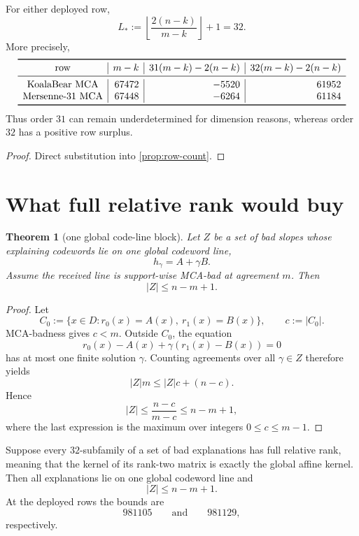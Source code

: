 \documentclass[11pt,a4paper]{amsart}
\numberwithin{equation}{section}
\newtheorem{theorem}{Theorem}[section]
\theoremstyle{remark}
\begin{document}
\begin{proposition}\label{prop:critical-32}
For either deployed row,
\[
 L_*:=\left\lfloor\frac{2(n-k)}{m-k}\right\rfloor+1=32.
\]
More precisely,
\[
\begin{array}{c|r|r|r}
\toprule
\text{row}&m-k&31(m-k)-2(n-k)&32(m-k)-2(n-k)\\
\midrule
\text{KoalaBear MCA}&67472&-5520&61952\\
\text{Mersenne-31 MCA}&67448&-6264&61184\\
\bottomrule
\end{array}
\]
Thus order $31$ can remain underdetermined for dimension reasons, whereas order $32$ has a positive row surplus.
\end{proposition}

\begin{proof}
Direct substitution into \cref{prop:row-count}.
\end{proof}

\section{What full relative rank would buy}

\begin{theorem}[one global code-line block]\label{thm:global-block}
Let $Z$ be a set of bad slopes whose explaining codewords lie on one global codeword line,
\[
 h_\gamma=A+\gamma B.
\]
Assume the received line is support-wise MCA-bad at agreement $m$.  Then
\[
 \boxed{|Z|\le n-m+1.}
\]
\end{theorem}

\begin{proof}
Let
\[
 C_0:=\{x\in D:r_0(x)=A(x),\ r_1(x)=B(x)\},
 \qquad c:=|C_0|.
\]
MCA-badness gives $c<m$.  Outside $C_0$, the equation
\[
 r_0(x)-A(x)+\gamma(r_1(x)-B(x))=0
\]
has at most one finite solution $\gamma$.  Counting agreements over all $\gamma\in Z$ therefore yields
\[
 |Z|m\le |Z|c+(n-c).
\]
Hence
\[
 |Z|\le\frac{n-c}{m-c}\le n-m+1,
\]
where the last expression is the maximum over integers $0\le c\le m-1$.
\end{proof}

\begin{corollary}\label{cor:generic-closure}
Suppose every $32$-subfamily of a set of bad explanations has full relative rank, meaning that the kernel of its rank-two matrix is exactly the global affine kernel.  Then all explanations lie on one global codeword line and
\[
 |Z|\le n-m+1.
\]
At the deployed rows the bounds are
\[
 981105
 \qquad\text{and}\qquad
 981129,
\]
respectively.
\end{corollary}
\end{document}
